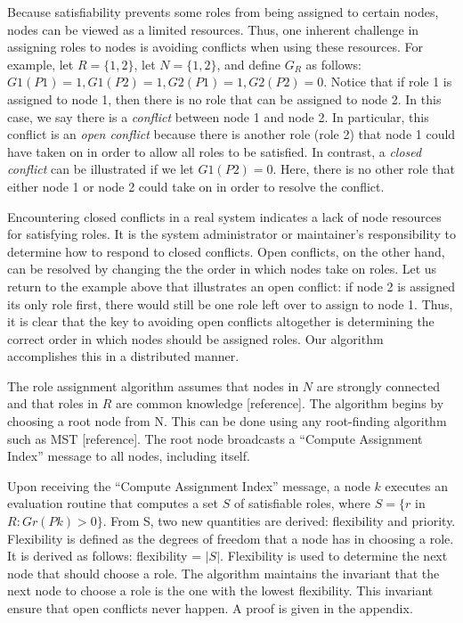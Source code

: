 \documentclass[11pt]{article}
\begin{document}
\begin{multicols}{2}
Because satisfiability prevents some roles from being assigned to certain nodes, nodes can be viewed as a limited resources. Thus, one inherent challenge in assigning roles to nodes is avoiding conflicts when using these resources. For example, let $R = \{1, 2\}$, let $N = \{1, 2\}$, and define $G_{R}$ as follows: $G1(P1) = 1, G1(P2) = 1, G2(P1) = 1, G2(P2) = 0$. Notice that if role 1 is assigned to node 1, then there is no role that can be assigned to node 2. In this case, we say there is a \textit{conflict} between node 1 and node 2. In particular, this conflict is an \textit{open conflict} because there is another role (role 2) that node 1 could have taken on in order to allow all roles to be satisfied. In contrast, a \textit{closed conflict} can be illustrated if we let $G1(P2) = 0$. Here, there is no other role that either node 1 or node 2 could take on in order to resolve the conflict.

Encountering closed conflicts in a real system indicates a lack of node resources for satisfying roles. It is the system administrator or maintainer's responsibility to determine how to respond to closed conflicts. Open conflicts, on the other hand, can be resolved by changing the the order in which nodes take on roles. Let us return to the example above that illustrates an open conflict: if node 2 is assigned its only role first, there would still be one role left over to assign to node 1. Thus, it is clear that the key to avoiding open conflicts altogether is determining the correct order in which nodes should be assigned roles. Our algorithm accomplishes this in a distributed manner.

The role assignment algorithm assumes that nodes in $N$ are strongly connected and that roles in $R$ are common knowledge [reference]. The algorithm begins by choosing a root node from N. This can be done using any root-finding algorithm such as MST [reference]. The root node broadcasts a ``Compute Assignment Index'' message to all nodes, including itself.

Upon receiving the ``Compute Assignment Index'' message, a node $k$ executes an evaluation routine that computes a set $S$ of satisfiable roles, where $S = \{r$ in $R : Gr(Pk) > 0\}$. From S, two new quantities are derived: flexibility and priority. Flexibility is defined as the degrees of freedom that a node has in choosing a role. It is derived as follows: flexibility = $|S|$. Flexibility is used to determine the next node that should choose a role. The algorithm maintains the invariant that the next node to choose a role is the one with the lowest flexibility. This invariant ensure that open conflicts never happen. A proof is given in the appendix.


\end{multicols}
\end{document}
